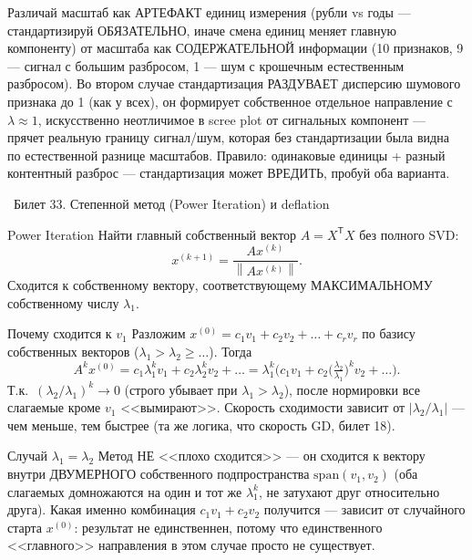 \documentclass[12pt, a4paper]{article}
\newcommand{\bilet}[2]{%
  \vspace{10pt}%
  \noindent\colorbox{qcolor}{\parbox{\dimexpr\linewidth-2\fboxsep\relax}{%
    \color{white}\large\bfseries\strut\ Билет #1. #2%
  }}%
  \nopagebreak\vspace{5pt}\par\nopagebreak%
}
\newcommand{\tr}{^{\mathsf{T}}}
\newcommand{\norm}[1]{\left\lVert #1 \right\rVert}
\begin{document}
\begin{fishkabox}
Различай масштаб как АРТЕФАКТ единиц измерения (рубли vs годы --- стандартизируй ОБЯЗАТЕЛЬНО, иначе смена единиц меняет главную компоненту) от масштаба как СОДЕРЖАТЕЛЬНОЙ информации (10 признаков, 9 --- сигнал с большим разбросом, 1 --- шум с крошечным естественным разбросом). Во втором случае стандартизация РАЗДУВАЕТ дисперсию шумового признака до 1 (как у всех), он формирует собственное отдельное направление с $\lambda\approx1$, искусственно неотличимое в scree plot от сигнальных компонент --- прячет реальную границу сигнал/шум, которая без стандартизации была видна по естественной разнице масштабов. Правило: одинаковые единицы + разный контентный разброс --- стандартизация может ВРЕДИТЬ, пробуй оба варианта.
\end{fishkabox}

\bilet{33}{Степенной метод (Power Iteration) и deflation}

\begin{defbox}{Power Iteration}
Найти главный собственный вектор $A = X\tr X$ без полного SVD:
\[
  x^{(k+1)} = \frac{Ax^{(k)}}{\norm{Ax^{(k)}}}.
\]
Сходится к собственному вектору, соответствующему МАКСИМАЛЬНОМУ собственному числу $\lambda_1$.
\end{defbox}

\begin{proofbox}{Почему сходится к $v_1$}
Разложим $x^{(0)} = c_1v_1 + c_2v_2 + \dots + c_rv_r$ по базису собственных векторов ($\lambda_1 > \lambda_2 \ge \dots$). Тогда
\[
  A^k x^{(0)} = c_1\lambda_1^k v_1 + c_2\lambda_2^k v_2 + \dots = \lambda_1^k\Big(c_1 v_1 + c_2\big(\tfrac{\lambda_2}{\lambda_1}\big)^k v_2 + \dots\Big).
\]
Т.к.\ $(\lambda_2/\lambda_1)^k \to 0$ (строго убывает при $\lambda_1>\lambda_2$), после нормировки все слагаемые кроме $v_1$ <<вымирают>>. Скорость сходимости зависит от $|\lambda_2/\lambda_1|$ --- чем меньше, тем быстрее (та же логика, что скорость GD, билет 18).
\end{proofbox}

\begin{rembox}{Случай $\lambda_1 = \lambda_2$}
Метод НЕ <<плохо сходится>> --- он сходится к вектору внутри ДВУМЕРНОГО собственного подпространства $\text{span}(v_1,v_2)$ (оба слагаемых домножаются на один и тот же $\lambda_1^k$, не затухают друг относительно друга). Какая именно комбинация $c_1v_1+c_2v_2$ получится --- зависит от случайного старта $x^{(0)}$: результат не единственнен, потому что единственного <<главного>> направления в этом случае просто не существует.
\end{rembox}
\end{document}
